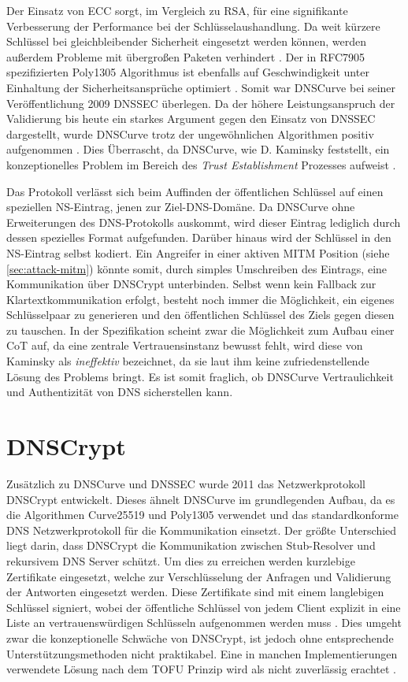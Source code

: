 Der Einsatz von \ac{ECC} sorgt, im Vergleich zu RSA, für eine signifikante Verbesserung der Performance bei der Schlüsselaushandlung. Da weit kürzere Schlüssel bei gleichbleibender Sicherheit eingesetzt werden können, werden außerdem Probleme mit übergroßen Paketen verhindert \cite{Gupta2002}. Der in RFC7905 \cite{rfc7905} spezifizierten Poly1305 Algorithmus ist ebenfalls auf Geschwindigkeit unter Einhaltung der Sicherheitsansprüche optimiert \cite{Bernstein2005}. Somit war DNSCurve bei seiner Veröffentlichung 2009 \ac{DNSSEC} überlegen. Da der höhere Leistungsanspruch der Validierung bis heute ein starkes Argument gegen den Einsatz von \ac{DNSSEC} dargestellt, wurde DNSCurve trotz der ungewöhnlichen Algorithmen positiv aufgenommen \cite{Henry2013}. Dies Überrascht, da DNSCurve, wie D. Kaminsky feststellt, ein konzeptionelles Problem im Bereich des \textit{Trust Establishment} Prozesses aufweist \cite{Kaminsky2011}. 

Das Protokoll verlässt sich beim Auffinden der öffentlichen Schlüssel auf einen speziellen NS-Eintrag, jenen zur Ziel-DNS-Domäne. Da DNSCurve ohne Erweiterungen des DNS-Protokolls auskommt, wird dieser Eintrag lediglich durch dessen spezielles Format aufgefunden. Darüber hinaus wird der Schlüssel in den NS-Eintrag selbst kodiert. Ein Angreifer in einer aktiven MITM Position (siehe \ref{sec:attack-mitm}) könnte somit, durch simples Umschreiben des Eintrags, eine Kommunikation über DNSCrypt unterbinden. Selbst wenn kein Fallback zur Klartextkommunikation erfolgt, besteht noch immer die Möglichkeit, ein eigenes Schlüsselpaar zu generieren und den öffentlichen Schlüssel des Ziels gegen diesen zu tauschen. In der Spezifikation scheint zwar die Möglichkeit zum Aufbau einer CoT auf, da eine zentrale Vertrauensinstanz bewusst fehlt, wird diese von Kaminsky als \textit{ineffektiv} bezeichnet, da sie laut ihm keine zufriedenstellende Lösung des Problems bringt. Es ist somit fraglich, ob DNSCurve  Vertraulichkeit und Authentizität von DNS sicherstellen kann.  

\section{DNSCrypt}
Zusätzlich zu DNSCurve und \ac{DNSSEC} wurde 2011 das Netzwerkprotokoll DNSCrypt entwickelt. Dieses ähnelt DNSCurve im grundlegenden Aufbau, da es die Algorithmen Curve25519 und Poly1305 verwendet und das standardkonforme DNS Netzwerkprotokoll für die Kommunikation einsetzt. Der größte Unterschied liegt darin, dass DNSCrypt die Kommunikation zwischen Stub-Resolver und rekursivem DNS Server schützt. Um dies zu erreichen werden kurzlebige Zertifikate eingesetzt, welche zur Verschlüsselung der Anfragen und Validierung der Antworten eingesetzt werden. Diese Zertifikate sind mit einem langlebigen Schlüssel signiert, wobei der öffentliche Schlüssel von jedem Client explizit in eine Liste an vertrauenswürdigen Schlüsseln aufgenommen werden muss \cite{Denis2016}. Dies umgeht zwar die konzeptionelle Schwäche von DNSCrypt, ist jedoch ohne entsprechende Unterstützungsmethoden nicht praktikabel. Eine in manchen Implementierungen verwendete Lösung nach dem \ac{TOFU} Prinzip wird als nicht zuverlässig erachtet \cite{Wendlandt2008}. 

